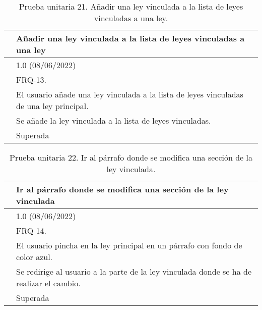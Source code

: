\begin{table}[H]
\begin{center}
\begin{tabular}{|p{3cm}|p{10cm}|} \hline
\centering {\bf PU-21} & Añadir una ley vinculada a la lista de leyes vinculadas a una ley  \\ \hline\hline
\centering {\bf Versión} & 1.0 (08/06/2022) \\ \hline
\centering {\bf Dependencias} & FRQ-13. \\ \hline
\centering {\bf Descripción} &  El usuario añade una ley vinculada a la lista de leyes vinculadas de una ley principal. \\ \hline
\centering {\bf Criterio de aceptación} & Se añade la ley vinculada a la lista de leyes vinculadas. \\ \hline
\centering {\bf Estado} & Superada \\ \hline
\end{tabular}
\caption{Prueba unitaria 21. Añadir una ley vinculada a la lista de leyes vinculadas a una ley.}
\label{enlacePU21}
\end{center}
\end{table}

\begin{table}[H]
\begin{center}
\begin{tabular}{|p{3cm}|p{10cm}|} \hline
\centering {\bf PU-22} & Ir al párrafo donde se modifica una sección de la ley vinculada  \\ \hline\hline
\centering {\bf Versión} & 1.0 (08/06/2022) \\ \hline
\centering {\bf Dependencias} & FRQ-14. \\ \hline
\centering {\bf Descripción} &  El usuario pincha en la ley principal en un párrafo con fondo de color azul. \\ \hline
\centering {\bf Criterio de aceptación} & Se redirige al usuario a la parte de la ley vinculada donde se ha de realizar el cambio. \\ \hline
\centering {\bf Estado} & Superada \\ \hline
\end{tabular}
\caption{Prueba unitaria 22. Ir al párrafo donde se modifica una sección de la ley vinculada.}
\label{enlacePU22}
\end{center}
\end{table}

